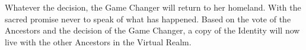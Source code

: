 Whatever the decision, the Game Changer will return to her homeland. With the sacred promise never to speak of what has happened. Based on the vote of the Ancestors and the decision of the Game Changer, a copy of the Identity will now live with the other Ancestors in the Virtual Realm.






